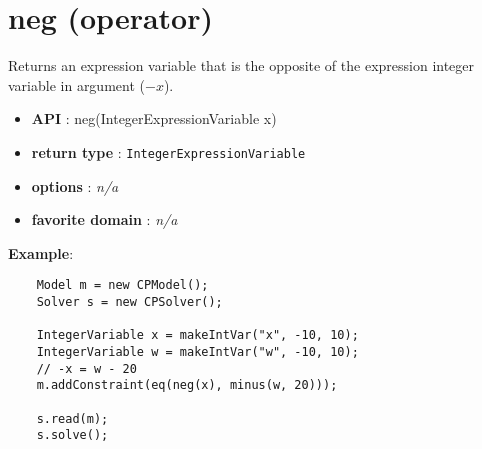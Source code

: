 \label{neg}
\hypertarget{neg}{}

\section{neg (operator)}\label{neg:negoperator}\hypertarget{neg:negoperator}{}

Returns an expression variable that is the opposite of the expression integer variable in argument (\(-x\)).

\begin{itemize}
	\item \textbf{API} : neg(IntegerExpressionVariable x)
	\item \textbf{return type} : \texttt{IntegerExpressionVariable}
	\item \textbf{options} : \emph{n/a}
	\item \textbf{favorite domain} : \emph{n/a}
\end{itemize}

\textbf{Example}:
\begin{lstlisting}
	Model m = new CPModel();
	Solver s = new CPSolver();
	
	IntegerVariable x = makeIntVar("x", -10, 10);
	IntegerVariable w = makeIntVar("w", -10, 10);
	// -x = w - 20
	m.addConstraint(eq(neg(x), minus(w, 20)));
	
	s.read(m);
	s.solve();
\end{lstlisting}
